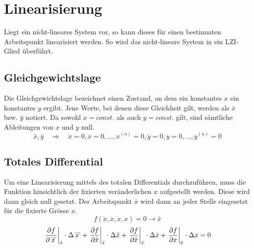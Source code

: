 \section{Linearisierung}
Liegt ein nicht-lineares System vor, so kann dieses für einen
bestimmten Arbeitspunkt linearisiert werden. So wird das
nicht-lineare System in ein LZI-Glied überführt.

\subsection{Gleichgewichtslage}
Die Gleichgewichtslage bezeichnet einen Zustand, an dem ein 
konstantes $x$ ein konstantes $y$ ergibt. Jene Werte, bei denen 
diese Gleichheit gilt, werden als $\bar{x}$ bzw. $\bar{y}$ 
notiert. Da sowohl $x=const.$ als auch $y=const.$ gilt, sind
sämtliche Ableitungen von $x$ und $y$ null.
\[  
    \bar{x}, \bar{y}
        \quad \Rightarrow \quad
        \dot{x} = 0,
        \ddot{x} = 0,    
        \dots,
        x^{(n)} = 0,
        \dot{y} = 0,
        \ddot{y} = 0,
        \dots,
        y^{(n)} = 0
\]

\subsection{Totales Differential}
Um eine Linearisierung mittels des totalen Differentials durchzuführen,
muss die Funktion hinsichtlich der fixierten veränderlichen $x$ 
aufgestellt werden. Diese wird dann gleich null gesetzt. 
Der Arbeitspunkt $\bar{x}$ wird dann an jeder Stelle eingesetzt für die 
fixierte Grösse $x$. 
\[ 
    f(\dddot{x}, \ddot{x}, \dot{x}, x) = 0 \rightarrow \bar{x}
\]
\[ 
    \begin{array}{r l} 
		\displaystyle 
            \left. \frac{\partial f}{\partial \dddot{x}}
                \right\rvert_{\bar{x}} \cdot \Delta \dddot{x}
            + \left.\frac{\partial f}{\partial \ddot{x}}
                \right\rvert_{\bar{x}} \cdot \Delta \ddot{x}
            + \left.\frac{\partial f}{\partial \dot{x}}
                \right\rvert_{\bar{x}} \cdot \Delta \dot{x}
            + \left.\frac{\partial f}{\partial x}
                \right\rvert_{\bar{x}} \cdot \Delta x 
            = 0\\
    \end{array} 
\]


